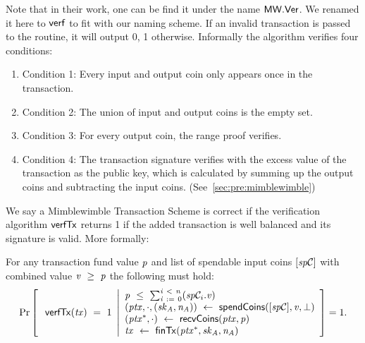 \begin{definition}
\begin{itemize}
        Note that in their work, one can be find it under the name $\mathsf{MW.Ver}$.
        We renamed it here to $\mathsf{verf}$ to fit with our naming scheme.
        If an invalid transaction is passed to the routine, it will output 0, 1 otherwise.
        Informally the algorithm verifies four conditions:
        \begin{enumerate}
            \item Condition 1: Every input and output coin only appears once in the transaction.
            \item Condition 2: The union of input and output coins is the empty set.
            \item Condition 3: For every output coin, the range proof verifies.
            \item Condition 4: The transaction signature verifies with the excess value of the transaction as the public key, which is calculated by summing up the output coins and subtracting the input coins. (See~\cref{sec:pre:mimblewimble})
        \end{enumerate}
    \end{itemize}
\end{definition}

We say a Mimblewimble Transaction Scheme is correct if the verification algorithm $\mathsf{verfTx}$ returns 1 if the added transaction is well balanced and its signature is valid.
More formally:
\begin{definition}
    \label{def:atom:tx-scheme-correctness}
    For any transaction fund value $\mathit{p}$ and list of spendable input coins $[\mathit{sp}\mathcal{C}]$ with combined value $\mathit{v} ~\geq~ \mathit{p}$ the following must hold:
    \[
        \Pr\left[
        \begin{array}{c}
            \: \mathsf{verfTx}(\mathit{tx}) ~=~ 1
        \end{array}
        \middle\vert
        \begin{array}{l}
            \mathit{p} ~\leq~ \sum_{\mathit{i} ~:=~ 0}^{\mathit{i} ~<~ \mathit{n}}(\mathit{sp}\mathcal{C}_{i}.\mathit{v}) \\
            (\mathit{ptx}, \cdot, (\mathit{sk}_{\mathit{A}}, \mathit{\mathit{n}_{\mathit{A}}})) ~\leftarrow~ \mathsf{spendCoins}([\mathit{sp}\mathcal{C}],\mathit{v},\bot) \\
            (\mathit{ptx}^*, \cdot) ~\leftarrow~ \mathsf{recvCoins}(\mathit{ptx},\mathit{p}) \\
            \mathit{tx} ~\leftarrow~ \mathsf{finTx}(\mathit{ptx}^*,\mathit{sk}_{\mathit{A}},\mathit{\mathit{n}_{\mathit{A}}})
        \end{array}
        \right]=1.
    \]
\end{definition}


